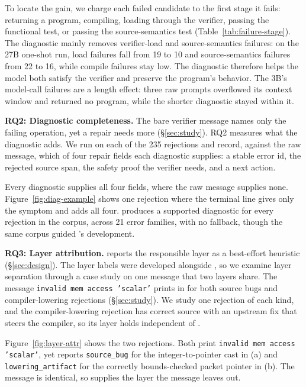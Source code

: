 To locate the gain, we charge each failed candidate to the first stage it fails: returning a program, compiling, loading through the verifier, passing the functional test, or passing the source-semantics test (Table~\ref{tab:failure-stage}). The diagnostic mainly removes verifier-load and source-semantics failures: on the 27B one-shot run, load failures fall from 19 to 10 and source-semantics failures from 22 to 16, while compile failures stay low. The diagnostic therefore helps the model both satisfy the verifier and preserve the program's behavior. The 3B's model-call failures are a length effect: three raw prompts overflowed its context window and returned no program, while the shorter diagnostic stayed within it.



\noindent\textbf{RQ2: Diagnostic completeness.} The bare verifier message names only the failing operation, yet a repair needs more (\S\ref{sec:study}). RQ2 measures what the \sys diagnostic adds. We run \sys on each of the 235 \empiricalset rejections and record, against the raw message, which of four repair fields each diagnostic supplies: a stable error id, the rejected source span, the safety proof the verifier needs, and a next action.

Every diagnostic supplies all four fields, where the raw message supplies none. Figure~\ref{fig:diag-example} shows one rejection where the terminal line gives only the symptom and \sys adds all four. \sys produces a supported diagnostic for every rejection in the corpus, across 21 error families, with no fallback, though the same corpus guided \sys's development.



\noindent\textbf{RQ3: Layer attribution.} \sys reports the responsible layer as a best-effort heuristic (\S\ref{sec:design}). The \empiricalset layer labels were developed alongside \sys, so we examine layer separation through a case study on one message that two layers share. The message \texttt{invalid mem access 'scalar'} prints in \empiricalset for both source bugs and compiler-lowering rejections (\S\ref{sec:study}). We study one rejection of each kind, and the compiler-lowering rejection has correct source with an upstream fix that steers the compiler, so its layer holds independent of \sys.

Figure~\ref{fig:layer-attr} shows the two rejections. Both print \texttt{invalid mem access 'scalar'}, yet \sys reports \texttt{source\_bug} for the integer-to-pointer cast in (a) and \texttt{lowering\_artifact} for the correctly bounds-checked packet pointer in (b). The message is identical, so \sys supplies the layer the message leaves out.


